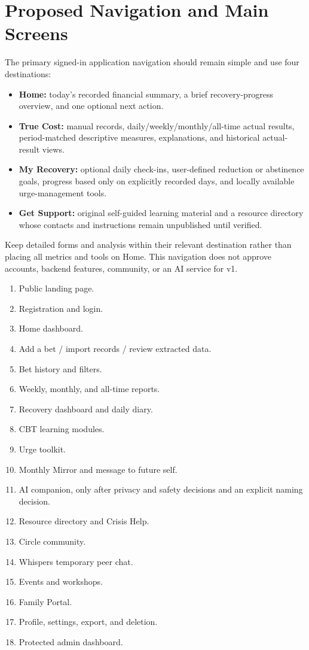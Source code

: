 \documentclass[11pt,a4paper]{article}
\begin{document}
\section{Proposed Navigation and Main Screens}

The primary signed-in application navigation should remain simple and use four destinations:
\begin{itemize}
  \item \textbf{Home:} today's recorded financial summary, a brief recovery-progress overview, and one optional next action.
  \item \textbf{True Cost:} manual records, daily/weekly/monthly/all-time actual results, period-matched descriptive measures, explanations, and historical actual-result views.
  \item \textbf{My Recovery:} optional daily check-ins, user-defined reduction or abstinence goals, progress based only on explicitly recorded days, and locally available urge-management tools.
  \item \textbf{Get Support:} original self-guided learning material and a resource directory whose contacts and instructions remain unpublished until verified.
\end{itemize}
Keep detailed forms and analysis within their relevant destination rather than placing all metrics and tools on Home. This navigation does not approve accounts, backend features, community, or an AI service for v1.

\begin{enumerate}
  \item Public landing page.
  \item Registration and login.
  \item Home dashboard.
  \item Add a bet / import records / review extracted data.
  \item Bet history and filters.
  \item Weekly, monthly, and all-time reports.
  \item Recovery dashboard and daily diary.
  \item CBT learning modules.
  \item Urge toolkit.
  \item Monthly Mirror and message to future self.
  \item AI companion, only after privacy and safety decisions and an explicit naming decision.
  \item Resource directory and Crisis Help.
  \item Circle community.
  \item Whispers temporary peer chat.
  \item Events and workshops.
  \item Family Portal.
  \item Profile, settings, export, and deletion.
  \item Protected admin dashboard.
\end{enumerate}
\end{document}
